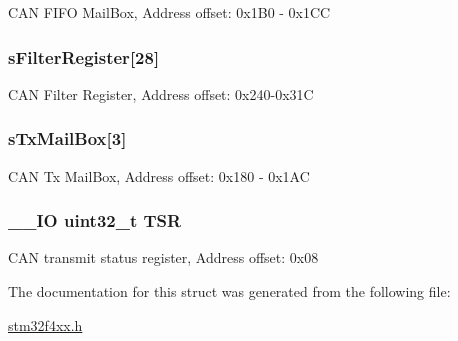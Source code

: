 C\-A\-N F\-I\-F\-O Mail\-Box, Address offset\-: 0x1\-B0 -\/ 0x1\-C\-C \hypertarget{struct_c_a_n___type_def_a31bd74513e6e599319702ad34113bf59}{
\subsubsection[{s\-Filter\-Register}]{ s\-Filter\-Register\mbox{[}28\mbox{]}}}\label{struct_c_a_n___type_def_a31bd74513e6e599319702ad34113bf59}
C\-A\-N Filter Register, Address offset\-: 0x240-\/0x31\-C \hypertarget{struct_c_a_n___type_def_ae37503ab1a7bbd29846f94cdadf0a9ef}{
\subsubsection[{s\-Tx\-Mail\-Box}]{ s\-Tx\-Mail\-Box\mbox{[}3\mbox{]}}}\label{struct_c_a_n___type_def_ae37503ab1a7bbd29846f94cdadf0a9ef}
C\-A\-N Tx Mail\-Box, Address offset\-: 0x180 -\/ 0x1\-A\-C \hypertarget{struct_c_a_n___type_def_a87e3001757a0cd493785f1f3337dd0e8}{
\subsubsection[{T\-S\-R}]{\setlength{\rightskip}{0pt plus 5cm}\-\_\-\-\_\-\-I\-O uint32\-\_\-t T\-S\-R}}\label{struct_c_a_n___type_def_a87e3001757a0cd493785f1f3337dd0e8}
C\-A\-N transmit status register, Address offset\-: 0x08 

The documentation for this struct was generated from the following file\-:\begin{DoxyCompactItemize}
\item 
\hyperlink{stm32f4xx_8h}{stm32f4xx.\-h}\end{DoxyCompactItemize}
